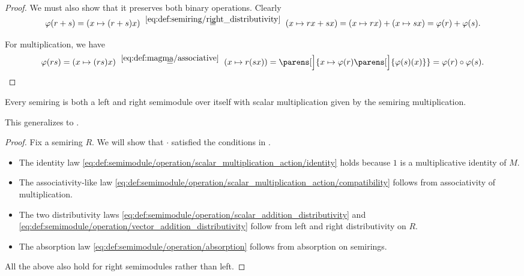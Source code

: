 \begin{proof}
  We must also show that it preserves both binary operations. Clearly
  \begin{equation*}
    \varphi(r + s)
    =
    (x \mapsto (r + s) x)
    \reloset {\eqref{eq:def:semiring/right_distributivity}} =
    (x \mapsto r x + s x)
    =
    (x \mapsto r x) + (x \mapsto s x)
    =
    \varphi(r) + \varphi(s).
  \end{equation*}

  For multiplication, we have
  \begin{equation*}
    \varphi(rs)
    =
    (x \mapsto (rs)x)
    \reloset {\eqref{eq:def:magma/associative}} =
    (x \mapsto r(sx))
    =
    \parens[\Big]{ x \mapsto \varphi(r)\parens[\Big]{ \varphi(s)(x) } }
    =
    \varphi(r) \bincirc \varphi(s).
  \end{equation*}
\end{proof}

\begin{proposition}\label{thm:semiring_is_semimodule}
  Every semiring is both a left and right semimodule over itself with scalar multiplication given by the semiring multiplication.

  This generalizes to .
\end{proposition}
\begin{proof}
  Fix a semiring \( R \). We will show that \( \cdot \) satisfied the conditions in .
  \begin{itemize}
    \item The identity law \eqref{eq:def:semimodule/operation/scalar_multiplication_action/identity} holds because \( 1 \) is a multiplicative identity of \( M \).
    \item The associativity-like law \eqref{eq:def:semimodule/operation/scalar_multiplication_action/compatibility} follows from associativity of multiplication.
    \item The two distributivity laws \eqref{eq:def:semimodule/operation/scalar_addition_distributivity} and \eqref{eq:def:semimodule/operation/vector_addition_distributivity} follow from left and right distributivity on \( R \).
    \item The absorption law \eqref{eq:def:semimodule/operation/absorption} follows from absorption on semirings.
  \end{itemize}

  All the above also hold for right semimodules rather than left.
\end{proof}

